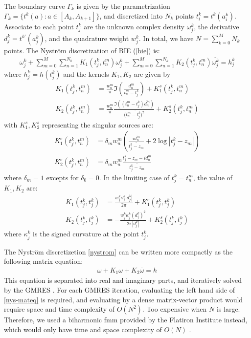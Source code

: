 \documentclass[10pt,twocolumn,letterpaper]{article}
\begin{document}
The boundary curve $\Gamma_k$ is given by the parametrization $\Gamma_k = \{
  t^k(a): a\in \left[A_k,A_{k+1}\right]\}$, and discretized into $N_k$ points
$t^k_i = t^k(a^k_i)$. Associate to each point $t^k_j$ are the unknown complex
density $\omega^k_j$, the derivative $d^k_j = t^{k\prime}(a^k_j)$, and the
quadrature weight $w^k_j$. In total, we have $N= \sum_{k=0}^M N_k$ points. The
Nystr\"om discretization of BIE (\ref{bie}) is:
\begin{align}
  \omega_j^k
  + \sum_{m=0}^{M}\sum_{n=1}^{N_k} K_1(t^k_j,t^m_n) \omega^k_j
  + \sum_{m=0}^{M}\sum_{n=1}^{N_k} K_2(t^k_j,t^m_n) \overline{\omega^k_j} = h^k_j
  \label{nystrom}
\end{align} where $h^k_j = h(t^k_j)$ and the kernels $K_1, K_2$ are given by
\begin{align}
  K_1(t^k_j, t^m_n)
   & = \frac{w^m_n}{\pi} \Im (\frac{d^m_n}{t^m_n-t^k_j}) + K_1^s(t^k_j,t^m_n)                                          \\
  K_2(t^k_j, t^m_n)
   & = \frac{w^m_n}{\pi} \frac{\Im((t^m_n-t^k_j)\overline{d^m_n})}{(\overline{t^m_n - t^k_j)^2}}  + K_2^s(t^k_j,t^m_n)
\end{align}
with $K_1^s, K_2^s$ representing the singular sources are:
\begin{align}
  K_1^s(t^k_j,t^m_n) & = \delta_m w^m_n \left(\frac{i\overline{d^m_n}}{\overline{t^k_j - z_m}}
  + 2 \log |t^k_j - z_m| \right)                                                               \\
  K_2^s(t^k_j,t^m_n) & = \delta_{m}w^m_n \frac{t^k_j-z_m-id^m_n}{\overline{t^k_j - z_m}}
\end{align}
where $\delta_m = 1$ excepts for $\delta_0 = 0$. In the limiting case of $t^k_j = t^m_n$, the value of $K_1,K_2$ are:
\begin{align}
  K_1(t^k_j, t^k_j) & = \frac{w^k_j \kappa^k_j|d^k_j|}{2\pi} + K_1^s(t^k_j,t^k_j)          \\
  K_2(t^k_j, t^k_j) & = -\frac{w^k_j\kappa^k_j(d^k_j)^2}{2\pi|d^k_j|} + K_2^s(t^k_j,t^k_j)
\end{align}where $\kappa^k_j$ is the signed curvature at the point $t^k_j$.

The Nystr\"om discretizetion \eqref{nystrom} can be written more compactly as
the following matrix equation:
\begin{align}
  \omega + K_1\omega + K_2\overline{\omega} = h \label{nys-mateq}
\end{align}
This equation is separated into real and imaginary parts, and iteratively solved by the GMRES \cite{saadGMRESGeneralizedMinimal1986}.
For each GMRES iteration, evaluating the left hand side of \eqref{nys-mateq}
is required, and evaluating by a dense matrix-vector product would require space and time complexity of $O(N^2)$. Too expensive when $N$ is large. Therefore, we used a biharmonic fmm provided by the Flatiron Institute instead, which would only have time and space complexity of $O(N)$ \cite{FlatironinstituteFmm2d2022}.
\end{document}
